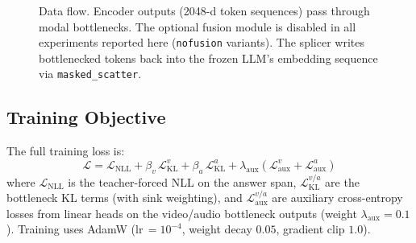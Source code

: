 \documentclass[11pt,a4paper]{article}
\begin{document}
\begin{figure}[h]
\caption{Data flow.  Encoder outputs (2048-d token sequences) pass through
modal bottlenecks.  The optional fusion module is disabled in all experiments
reported here (\texttt{nofusion} variants).  The splicer writes bottlenecked
tokens back into the frozen LLM's embedding sequence via \texttt{masked\_scatter}.}
\end{figure}

\subsection{Training Objective}

The full training loss is:
\[
  \mathcal{L} = \mathcal{L}_{\mathrm{NLL}}
    + \beta_v\,\mathcal{L}_{\mathrm{KL}}^v
    + \beta_a\,\mathcal{L}_{\mathrm{KL}}^a
    + \lambda_{\mathrm{aux}}\left(
        \mathcal{L}_{\mathrm{aux}}^v + \mathcal{L}_{\mathrm{aux}}^a
      \right)
\]
where $\mathcal{L}_{\mathrm{NLL}}$ is the teacher-forced NLL on the answer
span, $\mathcal{L}_{\mathrm{KL}}^{v/a}$ are the bottleneck KL terms
(with sink weighting), and $\mathcal{L}_{\mathrm{aux}}^{v/a}$ are auxiliary
cross-entropy losses from linear heads on the video/audio bottleneck outputs
(weight $\lambda_{\mathrm{aux}}{=}0.1$).  Training uses AdamW
(lr$\,{=}10^{-4}$, weight decay $0.05$, gradient clip $1.0$).
\end{document}
